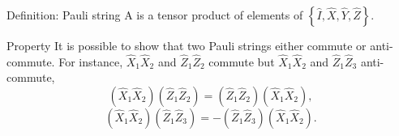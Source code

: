 \documentclass[a4paper]{article}
\begin{document}
\begin{parag}{Definition: Pauli string}
    A  is a tensor product of elements of $\left\{\hat{I}, \hat{X}, \hat{Y}, \hat{Z}\right\}$.

    \begin{subparag}{Property}
        It is possible to show that two Pauli strings either commute or anti-commute. For instance, $\hat{X}_1\hat{X}_2$ and $\hat{Z}_1\hat{Z}_2$ commute but $\hat{X}_1 \hat{X}_2$ and $\hat{Z}_1\hat{Z}_3$ anti-commute,
        \[\left(\hat{X}_1 \hat{X}_2\right)\left(\hat{Z}_1 \hat{Z}_2\right) = \left(\hat{Z}_1 \hat{Z}_2\right)\left(\hat{X}_1 \hat{X}_2\right),\]
    \[\left(\hat{X}_1 \hat{X}_2\right)\left(\hat{Z}_1 \hat{Z}_3\right) = -\left(\hat{Z}_1 \hat{Z}_3\right) \left(\hat{X}_1 \hat{X}_2\right).\]
    \end{subparag}
\end{parag}
\end{document}
